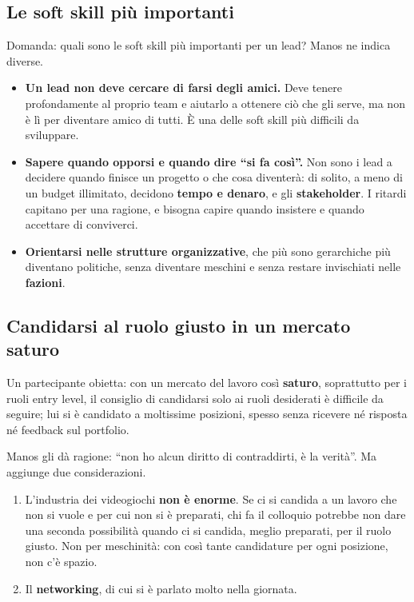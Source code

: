 \subsection{Le soft skill più importanti}

Domanda: quali sono le soft skill più importanti per un lead? Manos ne indica
diverse.
\begin{itemize}
  \item \textbf{Un lead non deve cercare di farsi degli amici.} Deve tenere
        profondamente al proprio team e aiutarlo a ottenere ciò che gli serve, ma
        non è lì per diventare amico di tutti. È una delle soft skill più difficili
        da sviluppare.
  \item \textbf{Sapere quando opporsi e quando dire ``si fa così''.} Non sono i
        lead a decidere quando finisce un progetto o che cosa diventerà: di solito,
        a meno di un budget illimitato, decidono \textbf{tempo e denaro}, e gli
        \textbf{stakeholder}. I ritardi capitano per una ragione, e bisogna capire
        quando insistere e quando accettare di conviverci.
  \item \textbf{Orientarsi nelle strutture organizzative}, che più sono
        gerarchiche più diventano politiche, senza diventare meschini e senza
        restare invischiati nelle \textbf{fazioni}.
\end{itemize}

\subsection{Candidarsi al ruolo giusto in un mercato saturo}

Un partecipante obietta: con un mercato del lavoro così \textbf{saturo},
soprattutto per i ruoli entry level, il consiglio di candidarsi solo ai ruoli
desiderati è difficile da seguire; lui si è candidato a moltissime posizioni,
spesso senza ricevere né risposta né feedback sul portfolio.

Manos gli dà ragione: ``non ho alcun diritto di contraddirti, è la verità''. Ma
aggiunge due considerazioni.
\begin{enumerate}
  \item L'industria dei videogiochi \textbf{non è enorme}. Se ci si candida a un
        lavoro che non si vuole e per cui non si è preparati, chi fa il colloquio
        potrebbe non dare una seconda possibilità quando ci si candida, meglio
        preparati, per il ruolo giusto. Non per meschinità: con così tante
        candidature per ogni posizione, non c'è spazio.
  \item Il \textbf{networking}, di cui si è parlato molto nella giornata.
\end{enumerate}

